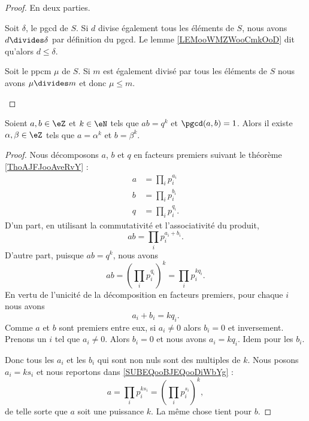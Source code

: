 \begin{proof}
	En deux parties.
	\begin{subproof}
		Soit \( \delta\), le pgcd de \( S\). Si \( d\) divise également tous les éléments de \( S\), nous avons \( d\divides \delta\) par définition du pgcd. Le lemme \ref{LEMooWMZWooCmkOoD} dit qu'alors \( d\leq \delta\).

		Soit le ppcm \( \mu\) de \( S\). Si \( m\) est également divisé par tous les éléments de \( S\) nous avons \( \mu\divides m\) et donc \( \mu\leq m\).
	\end{subproof}
\end{proof}

\begin{lemma}        \label{LEMooEVIZooPAkQZW}
	Soient \( a,b\in \eZ\) et \( k\in \eN\) tels que \( ab=q^k\) et \( \pgcd(a,b)=1\). Alors il existe \( \alpha,\beta\in\eZ\) tels que \( a=\alpha^k\) et \( b=\beta^k\).
\end{lemma}

\begin{proof}
	Nous décomposons \( a\), \( b\) et \( q\) en facteurs premiers suivant le théorème \ref{ThoAJFJooAveRvY} :
	\begin{subequations}
		\begin{align}
			a & = \prod_ip_i^{a_i}      \label{SUBEQooBJEQooDiWbYg} \\
			b & = \prod_ip_i^{b_i}                                  \\
			q & = \prod_{i}p_i^{q_i}.
		\end{align}
	\end{subequations}
	D'un part, en utilisant la commutativité et l'associativité du produit,
	\begin{equation}
		ab=\prod_ip_i^{a_i+b_i}.
	\end{equation}
	D'autre part, puisque \( ab=q^k\), nous avons
	\begin{equation}
		ab=(\prod_ip_i^{q_i})^k=\prod_ip_i^{kq_i}.
	\end{equation}
	En vertu de l'unicité de la décomposition en facteurs premiers, pour chaque \( i\) nous avons
	\begin{equation}
		a_i+b_i=kq_i.
	\end{equation}
	Comme \( a\) et \( b\) sont premiers entre eux, si \( a_i\neq0\) alors \( b_i=0\) et inversement. Prenons un \( i\) tel que \( a_i\neq 0\). Alors \( b_i=0\) et nous avons \( a_i=kq_i\). Idem pour les \( b_i\).

	Donc tous les \( a_i\) et les \( b_i\) qui sont non nuls sont des multiples de \( k\). Nous posons \( a_i=ks_i\) et nous reportons dans \eqref{SUBEQooBJEQooDiWbYg} :
	\begin{equation}
		a=\prod_ip_i^{ks_i}=(\prod_ip_i^{s_i})^k,
	\end{equation}
	de telle sorte que \( a\) soit une puissance \( k\)\ieme. La même chose tient pour \( b\).
\end{proof}

